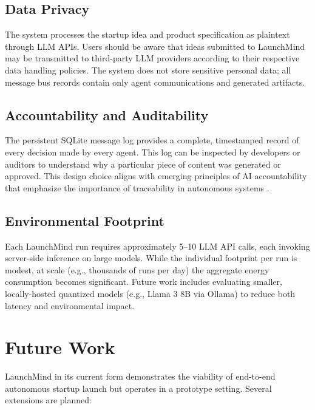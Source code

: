 \documentclass[conference]{IEEEtran}
\begin{document}
\subsection{Data Privacy}

The system processes the startup idea and product specification as plaintext through LLM APIs. Users should be aware that ideas submitted to LaunchMind may be transmitted to third-party LLM providers according to their respective data handling policies. The system does not store sensitive personal data; all message bus records contain only agent communications and generated artifacts.

\subsection{Accountability and Auditability}

The persistent SQLite message log provides a complete, timestamped record of every decision made by every agent. This log can be inspected by developers or auditors to understand why a particular piece of content was generated or approved. This design choice aligns with emerging principles of AI accountability that emphasize the importance of traceability in autonomous systems \cite{eu_ai_act2024}.

\subsection{Environmental Footprint}

Each LaunchMind run requires approximately 5--10 LLM API calls, each invoking server-side inference on large models. While the individual footprint per run is modest, at scale (e.g., thousands of runs per day) the aggregate energy consumption becomes significant. Future work includes evaluating smaller, locally-hosted quantized models (e.g., Llama 3 8B via Ollama) to reduce both latency and environmental impact.

\section{Future Work}
\label{sec:future}

LaunchMind in its current form demonstrates the viability of end-to-end autonomous startup launch but operates in a prototype setting. Several extensions are planned:
\end{document}

